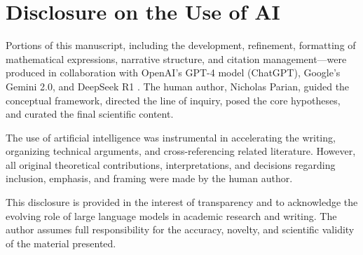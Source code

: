 \section*{Disclosure on the Use of AI}

Portions of this manuscript, including the development, refinement, formatting of mathematical expressions, narrative structure, and citation management—were produced in collaboration with OpenAI's GPT-4 model (ChatGPT), Google's Gemini 2.0, and DeepSeek R1 . The human author, Nicholas Parian, guided the conceptual framework, directed the line of inquiry, posed the core hypotheses, and curated the final scientific content.

The use of artificial intelligence was instrumental in accelerating the writing, organizing technical arguments, and cross-referencing related literature. However, all original theoretical contributions, interpretations, and decisions regarding inclusion, emphasis, and framing were made by the human author.

This disclosure is provided in the interest of transparency and to acknowledge the evolving role of large language models in academic research and writing. The author assumes full responsibility for the accuracy, novelty, and scientific validity of the material presented.
